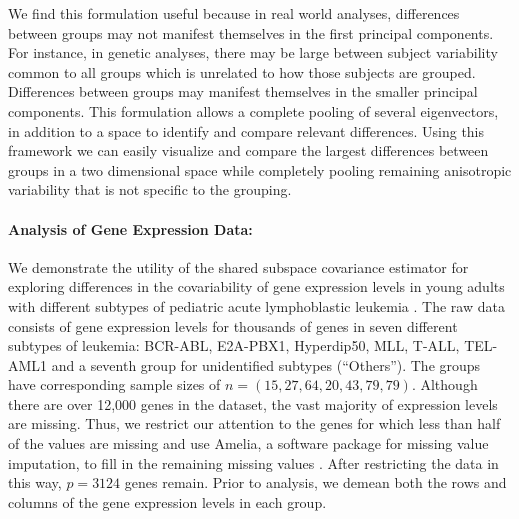 \documentclass{statsoc}
\begin{document}
We find this formulation useful because in real world analyses,
differences between groups may not manifest themselves in the first
principal components.  For instance, in genetic analyses, there may be
large between subject variability common to all groups which is
unrelated to how those subjects are grouped. Differences between
groups may manifest themselves in the smaller principal
components. This formulation allows a complete pooling of several
eigenvectors, in addition to a space to identify and compare relevant
differences.  Using this framework we can easily visualize and compare the
largest differences between groups in a two dimensional space while
completely pooling remaining anisotropic variability that is not
specific to the grouping.

\paragraph{Analysis of Gene Expression Data:}

We demonstrate the utility of the shared subspace covariance
estimator for exploring differences in the covariability of gene
expression levels in young adults with different subtypes of pediatric
acute lymphoblastic leukemia \citep{Yeoh2002}.  The raw data consists
of gene expression levels for thousands of genes in seven different
subtypes of leukemia: BCR-ABL, E2A-PBX1, Hyperdip50, MLL, T-ALL,
TEL-AML1 and a seventh group for unidentified subtypes (``Others'').  The groups
have corresponding sample sizes of $n = (15, 27, 64, 20, 43, 79, 79)$.
Although there are over 12,000 genes in the dataset, the vast majority of expression
levels are missing.  Thus, we restrict our attention to the genes for
which less than half of the values are missing and use Amelia, a
software package for missing value imputation, to fill in the
remaining missing values \citep{Amelia}.  After restricting the data
in this way, $p=3124$ genes remain.  Prior to analysis, we demean both
the rows and columns of the gene expression levels in each group.
\end{document}
